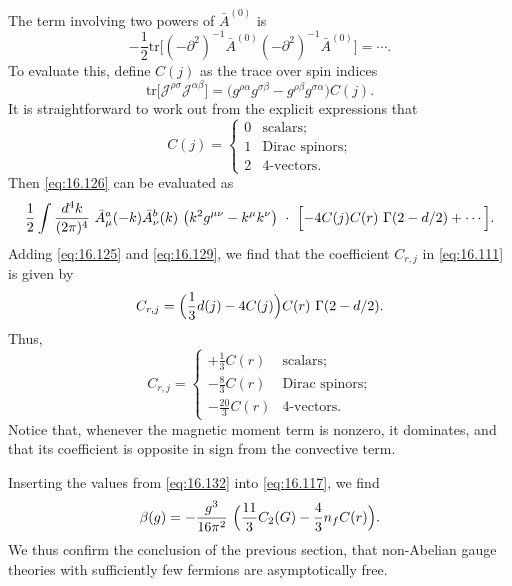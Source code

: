The term involving two powers of $\bar{A}^{(0)}$ is
\begin{equation}
  -\frac{1}{2}\mathrm{tr}\bigl[ (-\partial^2)^{-1}\bar{A}^{(0)}
    (-\partial^2)^{-1}\bar{A}^{(0)} \bigr] = \cdots .
  \label{eq:16.126}
\end{equation}
To evaluate this, define $C(j)$ as the trace over spin indices
\begin{equation}
  \mathrm{tr}\bigl[ \mathcal{J}^{\rho\sigma}\mathcal{J}^{\alpha\beta} \bigr]
  = \bigl( g^{\rho\alpha}g^{\sigma\beta} - g^{\rho\beta}g^{\sigma\alpha}
    \bigr)C(j) .
  \label{eq:16.127}
\end{equation}
It is straightforward to work out from the explicit expressions that
\begin{equation}
  C(j) = \begin{cases}
    0 & \text{scalars};\\
    1 & \text{Dirac spinors};\\
    2 & \text{4-vectors}.
  \end{cases}
  \label{eq:16.128}
\end{equation}
Then \eqref{eq:16.126} can be evaluated as
\begin{equation}
  \frac{1}{2}\int \frac{d^4k}{(2\pi)^4}\ \bar{A}^a_\mu(-k)\bar{A}^b_\nu(k)\
    \bigl( k^2g^{\mu\nu} - k^\mu k^\nu \bigr)\ \cdot\
    \Bigl[ -4C(j)C(r)\ \Gamma(2-d/2) + \cdots \Bigr] .
  \label{eq:16.129}
\end{equation}
Adding \eqref{eq:16.125} and \eqref{eq:16.129}, we find that the coefficient
$C_{r,j}$ in \eqref{eq:16.111} is given by
\begin{equation}
  C_{r,j} = \Bigl( \frac{1}{3}d(j) - 4C(j) \Bigr)C(r)\ \Gamma(2-d/2) .
  \label{eq:16.131}
\end{equation}
Thus,
\begin{equation}
  C_{r,j} = \begin{cases}
    +\frac{1}{3}C(r) & \text{scalars};\\
    -\frac{8}{3}C(r) & \text{Dirac spinors};\\
    -\frac{20}{3}C(r) & \text{4-vectors}.
  \end{cases}
  \label{eq:16.132}
\end{equation}
Notice that, whenever the magnetic moment term is nonzero, it dominates, and
that its coefficient is opposite in sign from the convective term.

Inserting the values from \eqref{eq:16.132} into \eqref{eq:16.117}, we find
\begin{equation}
  \beta(g) = -\frac{g^3}{16\pi^2}\ \Bigl( \frac{11}{3}C_2(G)
    - \frac{4}{3}n_fC(r) \Bigr) .
  \label{eq:16.133}
\end{equation}
We thus confirm the conclusion of the previous section, that non-Abelian
gauge theories with sufficiently few fermions are asymptotically free.

